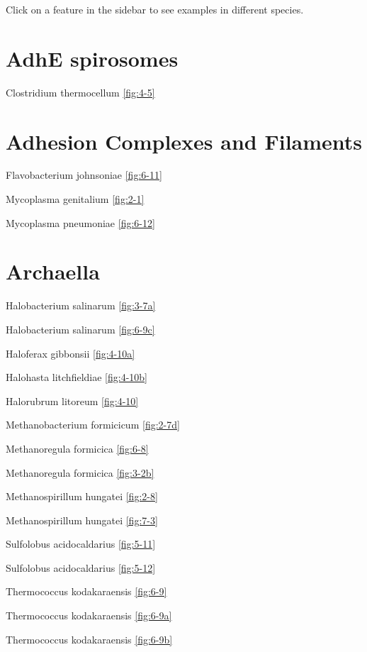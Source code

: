\documentclass[]{tufte-book}
\begin{document}
Click on a feature in the sidebar to see examples in different species.

\hypertarget{adhe-spirosomes}{%
\section*{AdhE spirosomes}\label{adhe-spirosomes}}

Clostridium thermocellum \ref{fig:4-5}

\hypertarget{adhesion-complexes-and-filaments}{%
\section*{Adhesion Complexes and Filaments}\label{adhesion-complexes-and-filaments}}

Flavobacterium johnsoniae \ref{fig:6-11}

Mycoplasma genitalium \ref{fig:2-1}

Mycoplasma pneumoniae \ref{fig:6-12}

\hypertarget{archaella}{%
\section*{Archaella}\label{archaella}}

Halobacterium salinarum \ref{fig:3-7a}

Halobacterium salinarum \ref{fig:6-9c}

Haloferax gibbonsii \ref{fig:4-10a}

Halohasta litchfieldiae \ref{fig:4-10b}

Halorubrum litoreum \ref{fig:4-10}

Methanobacterium formicicum \ref{fig:2-7d}

Methanoregula formicica \ref{fig:6-8}

Methanoregula formicica \ref{fig:3-2b}

Methanospirillum hungatei \ref{fig:2-8}

Methanospirillum hungatei \ref{fig:7-3}

Sulfolobus acidocaldarius \ref{fig:5-11}

Sulfolobus acidocaldarius \ref{fig:5-12}

Thermococcus kodakaraensis \ref{fig:6-9}

Thermococcus kodakaraensis \ref{fig:6-9a}

Thermococcus kodakaraensis \ref{fig:6-9b}
\end{document}
